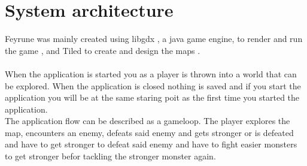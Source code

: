 \section{System architecture}
\begin{comment}
	The most overall, top level description of your application. If your application
	uses multiple components (such as servers, databases, etc.), describe their
	responsibilities here and show how they are dependent on each other and how they
	communicate (which protocols etc.)

	You will to describe the `flow' of the application at a high level. What happens
	if the application is started (and later stopped) and what the normal flow of
	operation is. Relate this to the different components (if any) in your
	application.
\end{comment}
Feyrune was mainly created using libgdx , a java game engine, to render and run the game \cite{libgdx}, and Tiled to create and design the maps \cite{tiled}. \\\\
When the application is started you as a player is thrown into a world that can be explored. When the application is closed nothing is saved and if you start the application you will be at the same staring poit as the first time you started the application.\\
The application flow can be described as a gameloop. The player explores the map, encounters an enemy, defeats said enemy and gets stronger or is defeated and have to get stronger to defeat said enemy and have to fight easier monsters to get stronger befor tackling the stronger monster again.